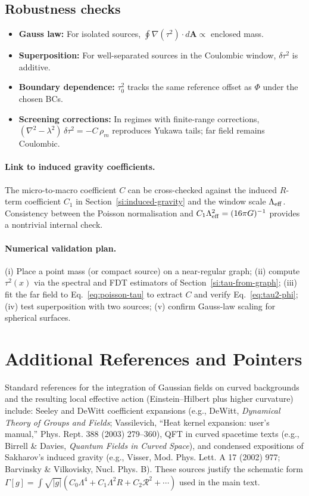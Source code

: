 \documentclass[11pt]{article}
\begin{document}
\subsection*{Robustness checks}
\begin{itemize}[leftmargin=*]
  \item \textbf{Gauss law:} For isolated sources, $\oint \nabla(\tau^2)\!\cdot d\mathbf A \propto$ enclosed mass.
  \item \textbf{Superposition:} For well-separated sources in the Coulombic window, $\delta\tau^2$ is additive.
  \item \textbf{Boundary dependence:} $\tau_0^2$ tracks the same reference offset as $\Phi$ under the chosen BCs.
  \item \textbf{Screening corrections:} In regimes with finite-range corrections, $(\nabla^2-\lambda^2)\,\delta\tau^2= -C\,\rho_m$ reproduces Yukawa tails; far field remains Coulombic.
\end{itemize}

\paragraph{Link to induced gravity coefficients.} The micro-to-macro coefficient $C$ can be cross-checked against the induced $R$-term coefficient $C_1$ in Section~\ref{si:induced-gravity} and the window scale $\Lambda_{\rm eff}$. Consistency between the Poisson normalisation and $C_1\Lambda_{\rm eff}^2=(16\pi G)^{-1}$ provides a nontrivial internal check.

\paragraph{Numerical validation plan.} (i) Place a point mass (or compact source) on a near-regular graph; (ii) compute $\tau^2(x)$ via the spectral and FDT estimators of Section~\ref{si:tau-from-graph}; (iii) fit the far field to Eq.~\eqref{eq:poisson-tau} to extract $C$ and verify Eq.~\eqref{eq:tau2-phi}; (iv) test superposition with two sources; (v) confirm Gauss-law scaling for spherical surfaces.

\section{Additional References and Pointers}\label{si:refs}
Standard references for the integration of Gaussian fields on curved backgrounds and the resulting local effective action (Einstein--Hilbert plus higher curvature) include: Seeley and DeWitt coefficient expansions (e.g., DeWitt, \emph{Dynamical Theory of Groups and Fields}; Vassilevich, ``Heat kernel expansion: user's manual,'' Phys. Rept. 388 (2003) 279--360), QFT in curved spacetime texts (e.g., Birrell \& Davies, \emph{Quantum Fields in Curved Space}), and condensed expositions of Sakharov's induced gravity (e.g., Visser, Mod. Phys. Lett. A 17 (2002) 977; Barvinsky \& Vilkovisky, Nucl. Phys. B). These sources justify the schematic form $\Gamma[g]=\int\sqrt{|g|}(C_0\Lambda^4+C_1\Lambda^2 R + C_2 \mathcal R^2+\cdots)$ used in the main text.
\end{document}
